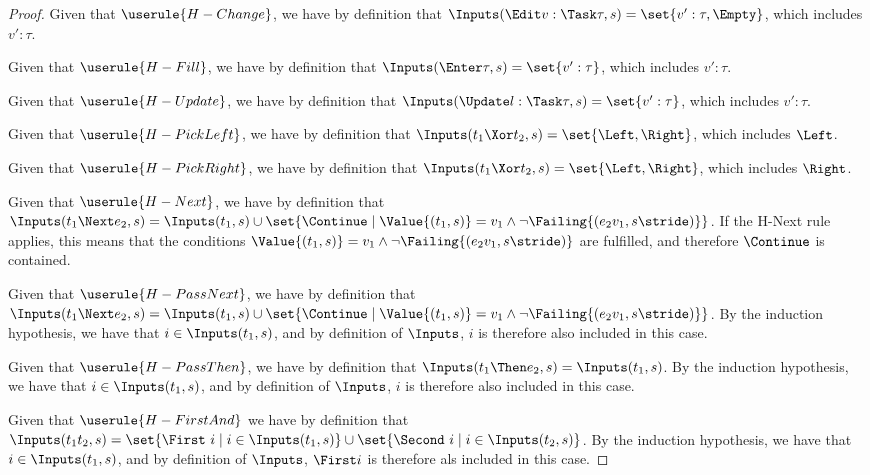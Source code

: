 \begin{proof}

       {Given that $\userule{H-Change}$, we have by definition that $\Inputs(\Edit v:\Task\tau,s) = \set{v':\tau,\Empty}$, which includes $v':\tau$.}

       {Given that $\userule{H-Fill}$, we have by definition that $\Inputs(\Enter \tau,s) = \set{v':\tau }$, which includes $v':\tau$.}

       {Given that $\userule{H-Update}$, we have by definition that $\Inputs(\Update l:\Task\tau,s)= \set{v':\tau }$, which includes $v':\tau$.}

       {Given that $\userule{H-PickLeft}$, we have by definition that $\Inputs(t_1\Xor t_2,s) = \set{ \Left,\Right}$, which includes $\Left$.}

       {Given that $\userule{H-PickRight}$, we have by definition that $\Inputs(t_1\Xor t_2,s) = \set{ \Left,\Right}$, which includes $\Right$.}

       {Given that $\userule{H-Next}$, we have by definition that $\Inputs(t_1\Next e_2,s) = \Inputs(t_1,s) \cup \set{\Continue\mid \Value{(t_1,s)} = v_1 \wedge \neg\Failing{(e_2 v_1,s\stride)}}$.
       If the H-Next rule applies, this means that the conditions $\Value{(t_1,s)} = v_1 \wedge \neg\Failing{(e_2 v_1,s\stride)}$ are fulfilled, and therefore $\Continue$ is contained.}

       {Given that $\userule{H-PassNext}$, we have by definition that $\Inputs(t_1\Next e_2,s) = \Inputs(t_1,s) \cup \set{\Continue\mid \Value{(t_1,s)} = v_1 \wedge \neg\Failing{(e_2 v_1,s\stride)}}$.
       By the induction hypothesis, we have that $i\in \Inputs(t_1,s)$, and by definition of $\Inputs$, $i$ is therefore also included in this case.}

       {Given that $\userule{H-PassThen}$, we have by definition that $\Inputs(t_1\Then e_2,s)= \Inputs(t_1,s)$.
       By the induction hypothesis, we have that $i\in \Inputs(t_1,s)$, and by definition of $\Inputs$, $i$ is therefore also included in this case.}

       {Given that $\userule{H-FirstAnd}$ we have by definition that $\Inputs(t_1\And t_2,s) = \set{\First\ i \mid i \in \Inputs(t_1,s)} \cup \set{\Second\ i \mid i \in \Inputs(t_2,s)}$.
       By the induction hypothesis, we have that $i\in\Inputs(t_1,s)$, and by definition of $\Inputs$, $\First i$ is therefore als included in this case.}


\end{proof}
